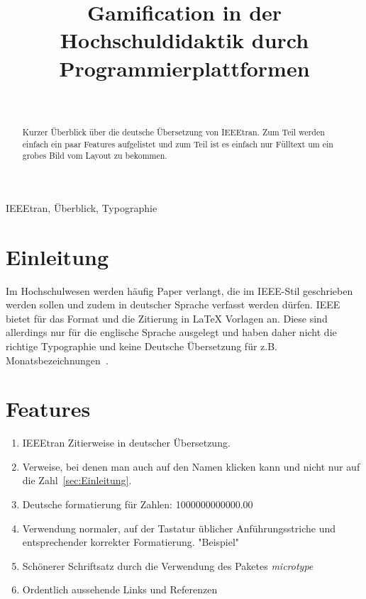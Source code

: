 \documentclass[10pt,a4paper,journal]{IEEEtran}
\begin{document}

\title{Gamification in der Hochschuldidaktik durch Programmierplattformen}

\author{\\
}

\maketitle

\begin{abstract}
	Kurzer Überblick über die deutsche Übersetzung von IEEEtran. Zum Teil werden einfach ein paar Features aufgelistet und zum Teil ist es einfach nur Fülltext um ein grobes Bild vom Layout zu bekommen.
\end{abstract}

\begin{IEEEkeywords}
IEEEtran, Überblick, Typographie
\end{IEEEkeywords}


\section{Einleitung}
\label{sec:Einleitung}
Im Hochschulwesen werden häufig Paper verlangt, die im IEEE-Stil geschrieben werden sollen und zudem in deutscher Sprache verfasst werden dürfen. IEEE bietet für das Format und die Zitierung in LaTeX Vorlagen an. Diese sind allerdings nur für die englische Sprache ausgelegt und haben daher nicht die richtige Typographie und keine Deutsche Übersetzung für z.B. Monatsbezeichnungen~\cite{Schueller2023}.

\section{Features}
\label{sec:Features}

\begin{enumerate}
    \item IEEEtran Zitierweise in deutscher Übersetzung.
    \item Verweise, bei denen man auch auf den Namen klicken kann und nicht nur auf die Zahl~\autoref{sec:Einleitung}.
    \item Deutsche formatierung für Zahlen: \num{1000000000000,00}
    \item Verwendung normaler, auf der Tastatur üblicher Anführungsstriche und entsprechender korrekter Formatierung. "Beispiel"
    \item Schönerer Schriftsatz durch die Verwendung des Paketes \textit{microtype}
    \item Ordentlich aussehende Links und Referenzen
\end{enumerate}


\small


\end{document}
